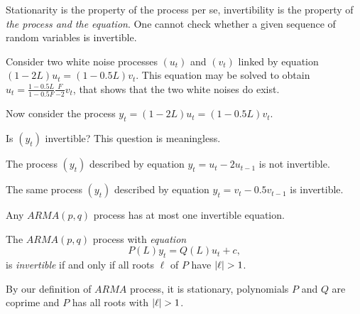 \documentclass[12pt]{article} %
\begin{document}
Stationarity is the property of the process per se, invertibility is the property of \textit{the process and the equation}. 
One cannot check whether a given sequence of random variables is invertible. 


\begin{example}
Consider two white noise processes $(u_t)$ and $(v_t)$ linked by equation $(1 - 2L) u_t = (1 - 0.5 L)v_t$.
This equation may be solved to obtain $u_t = \frac{1-0.5L}{1-0.5F} \frac{F}{-2} v_t$, that shows that the two white 
noises do exist. 

Now consider the process $y_t = (1 - 2L) u_t = (1 - 0.5 L)v_t$.

Is $(y_t)$ invertible? This question is meaningless. 

The process $(y_t)$ described by equation $y_t = u_t - 2u_{t-1}$ is not invertible. 

The same process $(y_t)$ described by equation $y_t = v_t - 0.5v_{t-1}$ is invertible. 
\end{example}




\begin{theorem}
Any $ARMA(p, q)$ process has at most one invertible equation.
\end{theorem}

\begin{theorem}
    The $ARMA(p, q)$ process with \textit{equation}
    \[
    P(L) y_t = Q(L) u_t + c,    
    \]
    is \textit{invertible} if and only if all roots $\ell$ of $P$ have $\abs{\ell} > 1$.
\end{theorem}

By our definition of $ARMA$ process, it is stationary, polynomials $P$ and $Q$ are coprime and $P$ has all roots with $\abs{\ell} > 1$.
\end{document}

